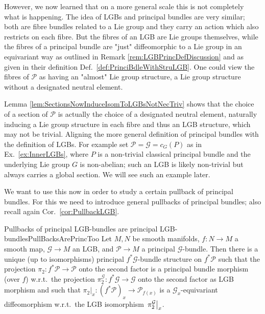 \documentclass[a4paper,oneside,11pt,bibliography=totoc]{scrartcl}
\theoremstyle{plain}
\theoremstyle{remark}
\theoremstyle{definition}
\begin{document}
However, we now learned that on a more general scale this is not completely what is happening. The idea of LGBs and principal bundles are very similar; both are fibre bundles related to a Lie group and they carry an action which also restricts on each fibre. But the fibres of an LGB are Lie groups themselves, while the fibres of a principal bundle are "just" diffeomorphic to a Lie group in an equivariant way as outlined in Remark \ref{rem:LGBPrincDefDiscussion} and as given in their definition Def.\ \ref{def:PrinciBdleWithStruLGB}. One could view the fibres of $\mathcal{P}$ as having an "almost" Lie group structure, a Lie group structure without a designated neutral element. 

Lemma \ref{lem:SectionsNowInduceIsomToLGBsNotNecTriv} shows that the choice of a section of $\mathcal{P}$ is actually the choice of a designated neutral element, naturally inducing a Lie group structure in each fibre and thus an LGB structure, which may not be trivial. Aligning the more general definition of principal bundles with the definition of LGBs. For example set $\mathcal{P} = \mathcal{G} = c_G(P)$ as in Ex.\ \ref{ex:InnerLGBs}, where $P$ is a non-trivial classical principal bundle and the underlying Lie group $G$ is non-abelian; such an LGB is likely non-trivial but always carries a global section. We will see such an example later.

We want to use this now in order to study a certain pullback of principal bundles. For this we need to introduce general pullbacks of principal bundles; also recall again Cor.\ \ref{cor:PullbackLGB}.

\begin{corollaries}{Pullbacks of principal LGB-bundles are principal LGB-bundles}{PullBacksArePrincToo}
Let $M, N$ be smooth manifolds, $f: N \to M$ a smooth map, $\mathcal{G} \to M$ an LGB, and $\mathcal{P} \to M$ a principal $\mathcal{G}$-bundle. Then there is a unique (up to isomorphisms) principal $f^*\mathcal{G}$-bundle structure on $f^*\mathcal{P}$ such that the projection $\pi_2: f^*\mathcal{P} \to \mathcal{P}$ onto the second factor is a principal bundle morphism (over $f$) w.r.t.\ the projection $\pi_2^{\mathcal{G}}: f^*\mathcal{G} \to \mathcal{G}$ onto the second factor as LGB morphism and such that $\pi_2|_x: (f^*\mathcal{P})_x \to \mathcal{P}_{f(x)}$ is a $\mathcal{G}_x$-equivariant diffeomorphism w.r.t.\ the LGB isomorphism $\mleft.\pi_2^{\mathcal{G}}\mright|_x$.
%
\end{corollaries}
\end{document}

